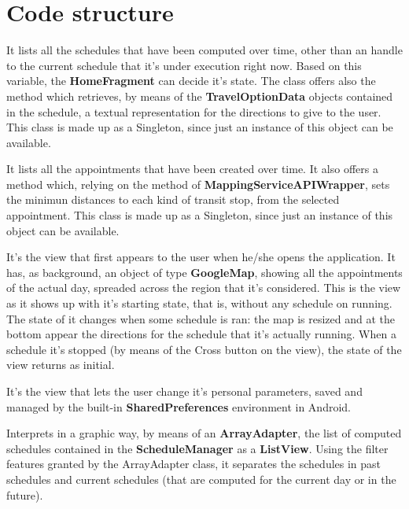 \chapter{Code structure}
It lists all the schedules that have been computed over time, other than an handle to the current schedule that it's under execution right now. Based on this variable, the \textbf{HomeFragment} can decide it's state. The class offers also the method  which retrieves, by means of the \textbf{TravelOptionData} objects contained in the schedule, a textual representation for the directions to give to the user.
This class is made up as a Singleton, since just an instance of this object can be available.

It lists all the appointments that have been created over time. It also offers a method which, relying on the  method of \textbf{MappingServiceAPIWrapper}, sets the minimun distances to each kind of transit stop, from the selected appointment.
This class is made up as a Singleton, since just an instance of this object can be available.

It's the view that first appears to the user when he/she opens the application. It has, as background, an object of type \textbf{GoogleMap}, showing all the appointments of the actual day, spreaded across the region that it's considered. This is the view as it shows up with it's starting state, that is, without any schedule on running. The state of it changes when some schedule is ran: the map is resized and at the bottom appear the directions for the schedule that it's actually running. When a schedule it's stopped (by means of the Cross button on the view), the state of the view returns as initial.

It's the view that lets the user change it's personal parameters, saved and managed by the built-in \textbf{SharedPreferences} environment in Android.

Interprets in a graphic way, by means of an \textbf{ArrayAdapter}, the list of computed schedules contained in the \textbf{ScheduleManager} as a \textbf{ListView}. Using the filter features granted by the ArrayAdapter class, it separates the schedules in past schedules and current schedules (that are computed for the current day or in the future). 

